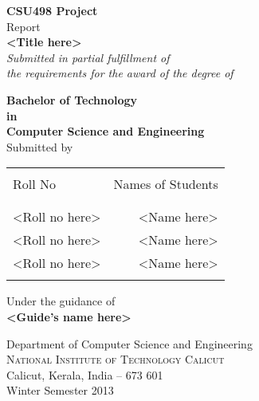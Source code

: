 \begin{titlepage}

\begin{center}

\textup{\small {\bf CSU498 Project} \\ Report}\\[0.2in]

\Large \textbf {<Title here>}\\[0.5in]

       \small \emph{Submitted in partial fulfillment of\\
        the requirements for the award of the degree of}
        \vspace{.2in}

       {\bf Bachelor of Technology \\in\\ Computer Science and Engineering}\\[0.5in]

\normalsize Submitted by \\
\begin{table}[h]
\centering
\begin{tabular}{lr}\hline \\
Roll No & Names of Students \\ \\ \hline
\\
<Roll no here> & <Name here> \\
<Roll no here> & <Name here> \\ 
<Roll no here> & <Name here> \\ \\ \hline 
\end{tabular}
\end{table}

\vspace{.1in}
Under the guidance of\\
{\textbf{<Guide's name here>}}\\[0.2in]

\vfill

\Large{Department of Computer Science and Engineering}\\
\normalsize
\textsc{National Institute of Technology Calicut}\\
Calicut, Kerala, India -- 673 601 \\
\vspace{0.2cm}
Winter Semester 2013

\end{center}

\end{titlepage}
